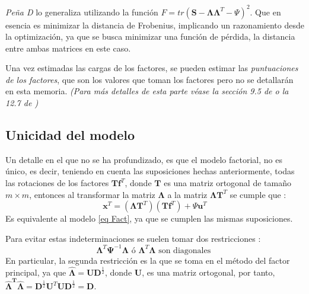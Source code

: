 \noindent \emph{Peña D} \cite{Peña 2002} lo generaliza utilizando la función $F=tr(\mathbf{S}-\mathbf{\Lambda}\mathbf{\Lambda}^T-\Psi)^2$. Que en esencia es minimizar la distancia de Frobenius, implicando un razonamiento desde la optimización, ya que se busca minimizar  una función de pérdida, la distancia entre ambas matrices en este caso. 

\noindent Una vez estimadas las cargas de los factores, se pueden estimar las \emph{puntuaciones de los factores}, que son los valores que toman los factores pero no se detallarán en esta memoria.  \emph{(Para más detalles de esta parte véase  la sección 9.5 de \cite{Johnson 2007} o la 12.7 de \cite{Peña 2002})}

\subsection{Unicidad del modelo}

\noindent Un detalle en el que no se ha profundizado, es que el modelo factorial, no es único, es decir, teniendo en cuenta las suposiciones hechas anteriormente, todas las rotaciones de los factores $\mathbf{Tf}^T$, donde $\mathbf{T}$ es una matriz ortogonal de tamaño $m\times m$, entonces al transformar la matriz $\mathbf{\Lambda}$ a la matriz $\mathbf{\Lambda T}^T$ se cumple que \cite{Mardia 1979}:
\begin{equation}
\mathbf{x}^T=(\mathbf{\Lambda T}^T)(\mathbf{Tf}^T)+\Psi\mathbf{u}^T
\end{equation}
\noindent Es equivalente al modelo \ref{eq Fact}, ya que se cumplen las mismas suposiciones. 

\noindent Para evitar estas indeterminaciones se suelen tomar dos restricciones \cite{Mardia 1979}:
\begin{equation}
\mathbf{\Lambda}^T \mathbf{\Psi}^{-1}\mathbf{\Lambda} \text{ ó } \mathbf{\Lambda}^T \mathbf{\Lambda} \text{ son diagonales }
\end{equation}
\noindent En particular, la segunda restricción es la que se toma en el método del factor principal, ya que $\mathbf{\hat{\Lambda}}=\mathbf{UD}^{\frac{1}{2}}$, donde $\mathbf{U}$, es una matriz ortogonal, por tanto, $\mathbf{\hat{\Lambda}^T \hat{\Lambda}}=\mathbf{D}^{\frac{1}{2}}\mathbf{U}^T\mathbf{U}\mathbf{D}^{\frac{1}{2}}=\mathbf{D}$. 

